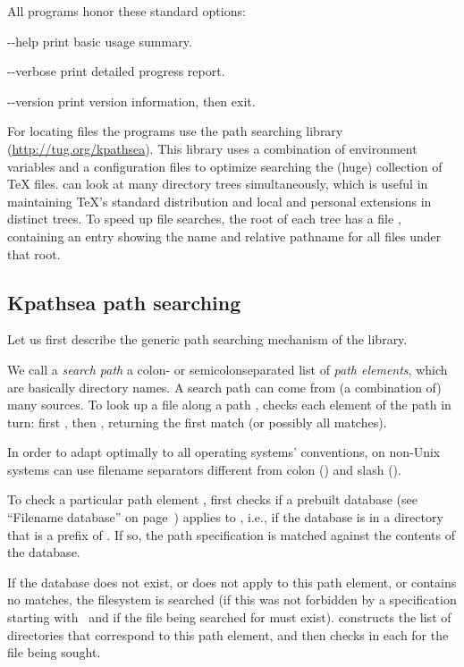 \documentclass{article}
\begin{document}
All programs honor these standard \GNU options:
\begin{ttdescription}
\item[-{}-help] print basic usage summary.
\item[-{}-verbose] print detailed progress report.
\item[-{}-version] print version information, then exit.
\end{ttdescription}

For locating files the \Webc{} programs use the path searching library
\KPS{} (\url{http://tug.org/kpathsea}).  This library uses a combination
of environment variables and a configuration files to optimize searching
the (huge) collection of \TeX{} files.  \Webc{} can look at many
directory trees simultaneously, which is useful in maintaining \TeX's
standard distribution and local and personal extensions in distinct
trees.  To speed up file searches, the root of each tree has a file
, containing an entry showing the name and relative pathname
for all files under that root.


\subsection{Kpathsea path searching}
\label{sec:kpathsea}

Let us first describe the generic path searching mechanism of the \KPS{}
library.

We call a \emph{search path} a colon- or semicolon\hyph sepa\-rated list
of \emph{path elements}, which are basically directory names.  A
search path can come from (a combination of) many sources.  To look up
a file  along a path , \KPS{} checks each
element of the path in turn: first , then
, returning the first match (or possibly all
matches).

In order to adapt optimally to all operating systems' conventions, on
non-Unix systems \KPS{} can use filename separators different from
colon (\samp{:}) and slash (\samp{/}).

To check a particular path element , \KPS{} first checks if a
prebuilt database (see ``Filename data\-base'' on
page~\pageref{sec:filename-database}) applies to , i.e., if the
database is in a directory that is a prefix of .  If so, the path
specification is matched against the contents of the database.

If the database does not exist, or does not apply to this path
element, or contains no matches, the filesystem is searched (if this
was not forbidden by a specification starting with \samp{!!}\ and if
the file being searched for must exist).  \KPS{} constructs the list
of directories that correspond to this path element, and then checks
in each for the file being sought.
\end{document}
